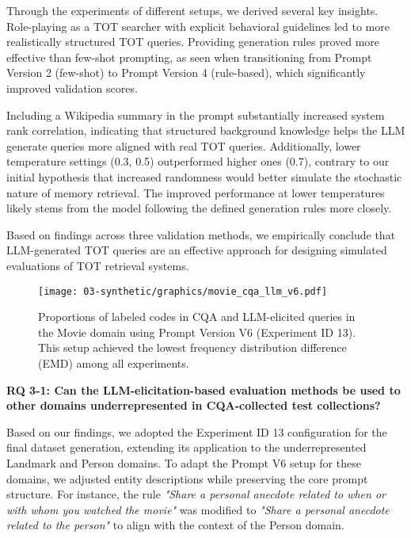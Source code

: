 Through the experiments of different setups, we derived several key insights. Role-playing as a TOT searcher with explicit behavioral guidelines led to more realistically structured TOT queries. Providing generation rules proved more effective than few-shot prompting, as seen when transitioning from Prompt Version 2 (few-shot) to Prompt Version 4 (rule-based), which significantly improved validation scores.

Including a Wikipedia summary in the prompt substantially increased system rank correlation, indicating that structured background knowledge helps the LLM generate queries more aligned with real TOT queries. Additionally, lower temperature settings (0.3, 0.5) outperformed higher ones (0.7), contrary to our initial hypothesis that increased randomness would better simulate the stochastic nature of memory retrieval. The improved performance at lower temperatures likely stems from the model following the defined generation rules more closely.

Based on findings across three validation methods, we empirically conclude that LLM-generated TOT queries are an effective approach for designing simulated evaluations of TOT retrieval systems.







\begin{figure} 
\centering
\texttt{[image: 03-synthetic/graphics/movie\_cqa\_llm\_v6.pdf]}
\caption{
Proportions of labeled codes in CQA and LLM-elicited queries in the Movie domain using Prompt Version V6 (Experiment ID 13). This setup achieved the lowest frequency distribution difference (EMD) among all experiments.
}
\label{fig:cqa-llm-v6-ling}
\end{figure}




\textbf{RQ 3-1: Can the LLM-elicitation-based evaluation methods be used to other domains underrepresented in CQA-collected test collections?}


Based on our findings, we adopted the Experiment ID 13 configuration for the final dataset generation, extending its application to the underrepresented Landmark and Person domains. To adapt the Prompt V6 setup for these domains, we adjusted entity descriptions while preserving the core prompt structure.
For instance, the rule \textit{"Share a personal anecdote related to when or with whom you watched the movie"} was modified to \textit{"Share a personal anecdote related to the person"} to align with the context of the Person domain.


